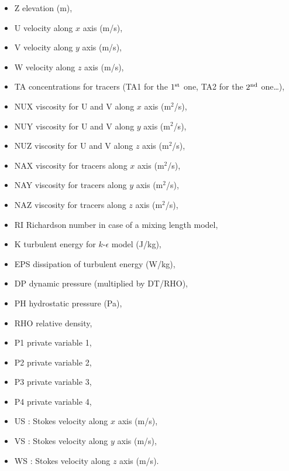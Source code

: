 \begin{itemize}
\item Z elevation (m),

\item U velocity along $x$ axis (m/s),

\item V velocity along $y$ axis (m/s),

\item W velocity along $z$ axis (m/s),

\item TA concentrations for tracers (TA1 for the ${1}^{\rm{st}}$ one, TA2 for the
${2}^{\rm{nd}}$ one\dots ),

\item NUX viscosity for U and V along $x$ axis (m${}^{2}$/s),

\item NUY viscosity for U and V along $y$ axis (m${}^{2}$/s),

\item NUZ viscosity for U and V along $z$ axis (m${}^{2}$/s),

\item NAX viscosity for tracers along $x$ axis (m${}^{2}$/s),

\item NAY viscosity for tracers along $y$ axis (m${}^{2}$/s),

\item NAZ viscosity for tracers along $z$ axis (m${}^{2}$/s),

\item RI Richardson number in case of a mixing length model,

\item K turbulent energy for $k$-$\epsilon$ model (J/kg),

\item EPS dissipation of turbulent energy (W/kg),

\item DP dynamic pressure (multiplied by DT/RHO),

\item PH hydrostatic pressure (Pa),

\item RHO relative density,

\item P1 private variable 1,

\item P2 private variable 2,

\item P3 private variable 3,

\item P4 private variable 4,

\item US : Stokes velocity along $x$ axis (m/s),

\item VS : Stokes velocity along $y$ axis (m/s),

\item WS : Stokes velocity along $z$ axis (m/s).
\end{itemize}

